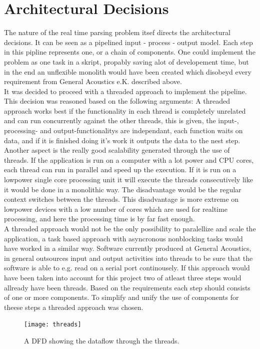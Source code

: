 \section{Architectural Decisions}
The nature of the real time parsing problem itsef directs the architectural decisions. It can be seen as a pipelined input - process - output model. Each step in this pipline represents one, or a chain of components. One could implement the problem as one task in a skript, propably saving alot of developement time, but in the end an unflexible monolith would have been created which disobeyd every requirement from General Acoustics e.K. described above.\\ It was decided to proceed with a threaded approach to implement the pipeline. This decision was reasoned based on the following arguments: A threaded approach works best if the functionality in each thread is completely unrelated and can run concurrently against the other threads, this is given, the input-, processing- and output-functionalitys are independant, each function waits on data, and if it is finished doing it's work it outputs the data to the nest step. Another aspect is the really good scalability generated through the use of threads. If the application is run on a computer with a lot power and CPU cores, each thread can run in parallel and speed up the execution. If it is run on a lowpower single core processing unit it will execute the threads consecutively like it would be done in a monolithic way. The disadvantage would be the regular context switches between the threads. This disadvantage is more extreme on lowpower devices with a low number of cores which are used for realtime processing, and here the processing time is by far fast enough.\\ A threaded approach would not be the only possibility to paralellize and scale the application, a task based approach with asyncronous nonblocking tasks would have worked in a similar way. Software currently produced at General Acoustics, in general outsources input and output activities into threads to be sure that the software is able to e.g. read on a serial port continousely. If this approach would have been taken into account for this project two of atleast three steps would allready have been threads. Based on the requirements each step should consists of one or more components. To simplify and unify the use of components for theese steps a threaded approach was chosen.\\
\begin{figure}[h]
\centering
      \texttt{[image: threads]}
        \caption{A DFD showing the dataflow through the threads.}
\end{figure}
